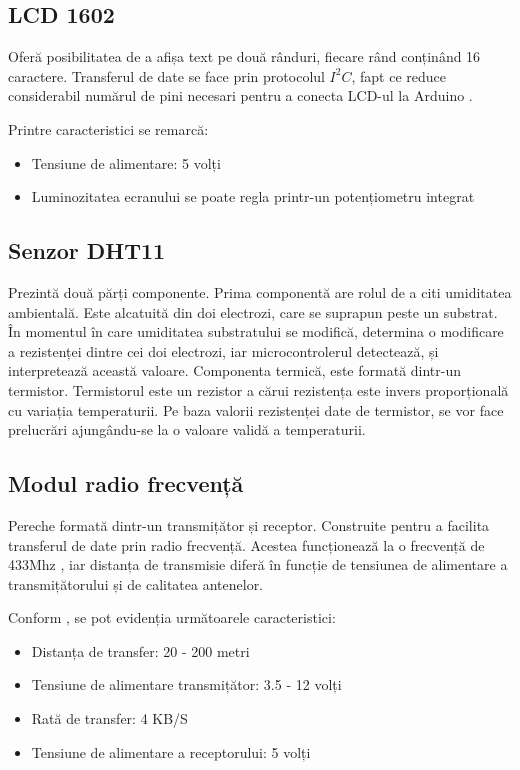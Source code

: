 \subsection{LCD 1602}

	Oferă posibilitatea de a afișa text pe două rânduri, fiecare rând conținând 16 caractere. Transferul de date se face prin protocolul $I^2C$, fapt ce reduce considerabil numărul de pini necesari pentru a conecta LCD-ul la Arduino \cite{lcd}.

\vspace{1em}

	Printre caracteristici se remarcă:
 		\begin{itemize}
			\setlength{\itemindent}{2em}
			\itemsep0em
			\item Tensiune de alimentare: 5 volți \cite{lcd}
			\item Luminozitatea ecranului se poate regla printr-un potențiometru integrat \cite{lcd}
		\end{itemize} 
	
\subsection{Senzor DHT11}

	Prezintă două părți componente. Prima componentă are rolul de a citi umiditatea ambientală. Este alcatuită din doi electrozi, care se suprapun peste un substrat. În momentul în care umiditatea substratului se modifică, determina o modificare a rezistenței dintre cei doi electrozi, iar microcontrolerul detectează, și interpretează această valoare. Componenta termică, este formată dintr-un termistor. Termistorul este un rezistor a cărui rezistența este invers proporțională cu variația temperaturii. Pe baza valorii rezistenței date de termistor, se vor face prelucrări ajungându-se la o valoare validă a temperaturii.

\subsection{Modul radio frecvență}

	Pereche formată dintr-un transmițător și receptor. Construite pentru a facilita transferul de date prin radio frecvență. Acestea funcționează la o frecvență de 433Mhz \cite{rfModule}, iar distanța de transmisie diferă în funcție de tensiunea de alimentare a transmițătorului și de calitatea antenelor.

	Conform \cite{rfModule}, se pot evidenția următoarele caracteristici:
 		\begin{itemize}
			\setlength{\itemindent}{2em}
			\itemsep0em
			\item Distanța de transfer: 20 - 200 metri
			\item Tensiune de alimentare transmițător: 3.5 - 12 volți
			\item Rată de transfer: 4 KB/S
			\item Tensiune de alimentare a receptorului: 5 volți
		\end{itemize} 


